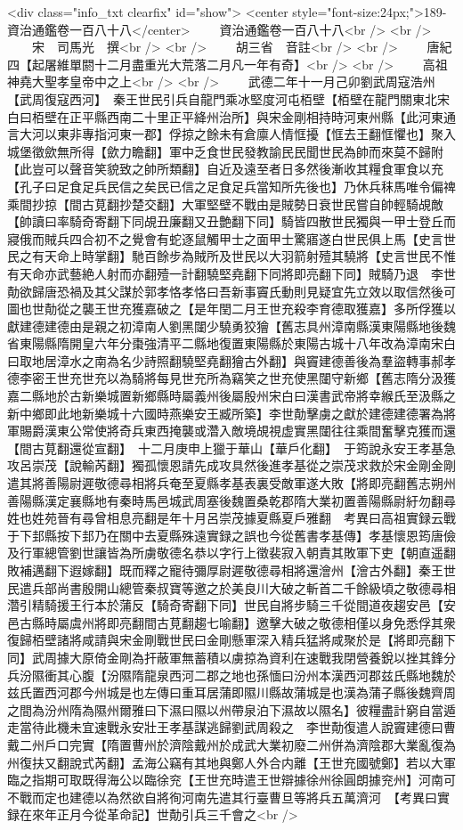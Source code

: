 <div class="info_txt clearfix" id="show">
<center style="font-size:24px;">189-資治通鑑卷一百八十八</center>
  　　資治通鑑卷一百八十八<br />
<br />
　　宋　司馬光　撰<br />
<br />
　　胡三省　音註<br />
<br />
　　唐紀四【起屠維單閼十二月盡重光大荒落二月凡一年有奇】<br />
<br />
　　高祖神堯大聖孝皇帝中之上<br />
<br />
　　武德二年十一月己卯劉武周寇浩州【武周復寇西河】　秦王世民引兵自龍門乘冰堅度河屯栢壁【栢壁在龍門關東北宋白曰栢壁在正平縣西南二十里正平絳州治所】與宋金剛相持時河東州縣【此河東通言大河以東非專指河東一郡】俘掠之餘未有倉廪人情恇擾【恇去王翻恇懼也】聚入城堡徵歛無所得【歛力瞻翻】軍中乏食世民發教諭民民聞世民為帥而來莫不歸附【此豈可以聲音笑貌致之帥所類翻】自近及遠至者日多然後漸收其糧食軍食以充【孔子曰足食足兵民信之矣民已信之足食足兵當知所先後也】乃休兵秣馬唯令偏禆乘間抄掠【間古莧翻抄楚交翻】大軍堅壁不戰由是賊勢日衰世民嘗自帥輕騎覘敵【帥讀曰率騎奇寄翻下同覘丑廉翻又丑艶翻下同】騎皆四散世民獨與一甲士登丘而寢俄而賊兵四合初不之覺會有蛇逐鼠觸甲士之面甲士驚寤遂白世民俱上馬【史言世民之有天命上時掌翻】馳百餘步為賊所及世民以大羽箭射殪其驍將【史言世民不惟有天命亦武藝絶人射而亦翻殪一計翻驍堅堯翻下同將即亮翻下同】賊騎乃退　李世勣欲歸唐恐禍及其父謀於郭孝恪孝恪曰吾新事竇氏動則見疑宜先立效以取信然後可圖也世勣從之襲王世充獲嘉破之【是年閏二月王世充殺李育德取獲嘉】多所俘獲以獻建德建德由是親之初漳南人劉黑闥少驍勇狡獪【舊志具州漳南縣漢東陽縣地後魏省東陽縣隋開皇六年分棗強清平二縣地復置東陽縣於東陽古城十八年改為漳南宋白曰取地居漳水之南為名少詩照翻驍堅堯翻獪古外翻】與竇建德善後為羣盜轉事郝孝德李密王世充世充以為騎將每見世充所為竊笑之世充使黑闥守新鄉【舊志隋分汲獲嘉二縣地於古新樂城置新鄉縣時屬義州後屬殷州宋白曰漢書武帝將幸緱氏至汲縣之新中鄉即此地新樂城十六國時燕樂安王臧所築】李世勣擊虜之獻於建德建德署為將軍賜爵漢東公常使將奇兵東西掩襲或濳入敵境覘視虚實黑闥往往乘間奮擊克獲而還【間古莧翻還從宣翻】　十二月庚申上獵于華山【華戶化翻】　于筠說永安王孝基急攻呂崇茂【說輸芮翻】獨孤懷恩請先成攻具然後進孝基從之崇茂求救於宋金剛金剛遣其將善陽尉遲敬德尋相將兵奄至夏縣孝基表裏受敵軍遂大敗【將即亮翻舊志朔州善陽縣漢定襄縣地有秦時馬邑城武周塞後魏置桑乾郡隋大業初置善陽縣尉紆勿翻尋姓也姓苑晉有尋曾相息亮翻是年十月呂崇茂據夏縣夏戶雅翻　考異曰高祖實録云戰于下邽縣按下邽乃在關中去夏縣殊遠實録之誤也今從舊書孝基傳】孝基懷恩筠唐儉及行軍總管劉世讓皆為所虜敬德名恭以字行上徵裴寂入朝責其敗軍下吏【朝直遥翻敗補邁翻下遐嫁翻】既而釋之寵待彌厚尉遲敬德尋相將還澮州【澮古外翻】秦王世民遣兵部尚書殷開山總管秦叔寶等邀之於美良川大破之斬首二千餘級頃之敬德尋相濳引精騎援王行本於蒲反【騎奇寄翻下同】世民自將步騎三千從間道夜趨安邑【安邑古縣時屬虞州將即亮翻間古莧翻趨七喻翻】邀擊大破之敬德相僅以身免悉俘其衆復歸栢壁諸將咸請與宋金剛戰世民曰金剛懸軍深入精兵猛將咸聚於是【將即亮翻下同】武周據大原倚金剛為扞蔽軍無蓄積以虜掠為資利在速戰我閉營養銳以挫其鋒分兵汾隰衝其心腹【汾隰隋龍泉西河二郡之地也孫愐曰汾州本漢西河郡兹氏縣地魏於兹氏置西河郡今州城是也左傳曰重耳居蒲即隰川縣故蒲城是也漢為蒲子縣後魏齊周之間為汾州隋為隰州爾雅曰下濕曰隰以州帶泉泊下濕故以隰名】彼糧盡計窮自當遁走當待此機未宜速戰永安壯王孝基謀逃歸劉武周殺之　李世勣復遣人說竇建德曰曹戴二州戶口完實【隋置曹州於濟陰戴州於成武大業初廢二州併為濟陰郡大業亂復為州復扶又翻說式芮翻】孟海公竊有其地與鄭人外合内離【王世充國號鄭】若以大軍臨之指期可取既得海公以臨徐兖【王世充時遣王世辯據徐州徐圓朗據兖州】河南可不戰而定也建德以為然欲自將徇河南先遣其行臺曹旦等將兵五萬濟河　【考異曰實録在來年正月今從革命記】世勣引兵三千會之<br />
